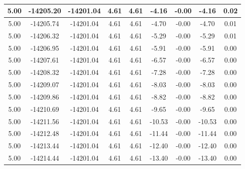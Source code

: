 \begin{table}[htbp]
\begin{adjustbox}{angle=90}
\begin{tabular}{|c|c|c|c|c|c|c|c|c|}
 5.00 & -14205.20 & -14201.04 & 4.61 & 4.61 & -4.16 & -0.00 & -4.16 & 0.02\\ \hline
 5.00 & -14205.74 & -14201.04 & 4.61 & 4.61 & -4.70 & -0.00 & -4.70 & 0.01\\ \hline
 5.00 & -14206.32 & -14201.04 & 4.61 & 4.61 & -5.29 & -0.00 & -5.29 & 0.01\\ \hline
 5.00 & -14206.95 & -14201.04 & 4.61 & 4.61 & -5.91 & -0.00 & -5.91 & 0.00\\ \hline
 5.00 & -14207.61 & -14201.04 & 4.61 & 4.61 & -6.57 & -0.00 & -6.57 & 0.00\\ \hline
 5.00 & -14208.32 & -14201.04 & 4.61 & 4.61 & -7.28 & -0.00 & -7.28 & 0.00\\ \hline
 5.00 & -14209.07 & -14201.04 & 4.61 & 4.61 & -8.03 & -0.00 & -8.03 & 0.00\\ \hline
 5.00 & -14209.86 & -14201.04 & 4.61 & 4.61 & -8.82 & -0.00 & -8.82 & 0.00\\ \hline
 5.00 & -14210.69 & -14201.04 & 4.61 & 4.61 & -9.65 & -0.00 & -9.65 & 0.00\\ \hline
 5.00 & -14211.56 & -14201.04 & 4.61 & 4.61 & -10.53 & -0.00 & -10.53 & 0.00\\ \hline
 5.00 & -14212.48 & -14201.04 & 4.61 & 4.61 & -11.44 & -0.00 & -11.44 & 0.00\\ \hline
 5.00 & -14213.44 & -14201.04 & 4.61 & 4.61 & -12.40 & -0.00 & -12.40 & 0.00\\ \hline
 5.00 & -14214.44 & -14201.04 & 4.61 & 4.61 & -13.40 & -0.00 & -13.40 & 0.00\\ \hline
            \end{tabular}
        \end{adjustbox}
        \caption{}
        \label{}
    \end{table}
    